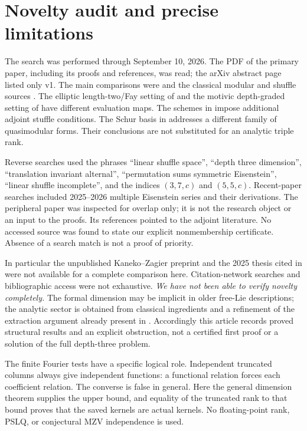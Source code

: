 \documentclass[12pt]{amsart}
\theoremstyle{definition}
\theoremstyle{remark}
\numberwithin{equation}{section}
\numberwithin{equation}{section}
\begin{document}
\section{Novelty audit and precise limitations}
The search was performed through September 10, 2026. The PDF of the primary
paper, including its proofs and references, was read; the arXiv abstract page
listed only v1. The main comparisons were \cite{bt,matthes,brown,anzawa,bim,kanno,bk,by}
and the classical modular and shuffle sources \cite{gkz,kzqm,hirose,reutenauer}.
The elliptic length-two/Fay setting of \cite{matthes} and the motivic
depth-graded setting of \cite{brown} have different evaluation maps.
The schemes in \cite{anzawa} impose additional adjoint stuffle conditions.
The Schur basis in \cite{by} addresses a different family of quasimodular
forms. Their conclusions are not substituted for an analytic triple rank.

Reverse searches used the phrases ``linear shuffle space'', ``depth three
dimension'', ``translation invariant alternal'', ``permutation sums symmetric
Eisenstein'', ``linear shuffle incomplete'', and the indices $(3,7,c)$ and
$(5,5,c)$. Recent-paper searches included 2025--2026 multiple Eisenstein
series and their derivations. The peripheral paper \cite{br} was inspected
for overlap only; it is not the research object or an input to the proofs.
Its references pointed to the adjoint literature. No accessed source was
found to state our explicit nonmembership certificate. Absence of a search
match is not a proof of priority.

In particular the unpublished Kaneko--Zagier preprint and the 2025 thesis
cited in \cite{br} were not available for a complete comparison here.
Citation-network searches and bibliographic access were not exhaustive.
\emph{We have not been able to verify novelty completely.}
The formal dimension may be implicit in older free-Lie descriptions;
the analytic sector is obtained from classical ingredients and a refinement
of the extraction argument already present in \cite{hst}. Accordingly this
article records proved structural results and an explicit obstruction, not
a certified first proof or a solution of the full depth-three problem.

The finite Fourier tests have a specific logical role. Independent truncated
columns always give independent functions: a functional relation forces each
coefficient relation. The converse is false in general. Here the general
dimension theorem supplies the upper bound, and equality of the truncated
rank to that bound proves that the saved kernels are actual kernels.
No floating-point rank, PSLQ, or conjectural MZV independence is used.
\end{document}
